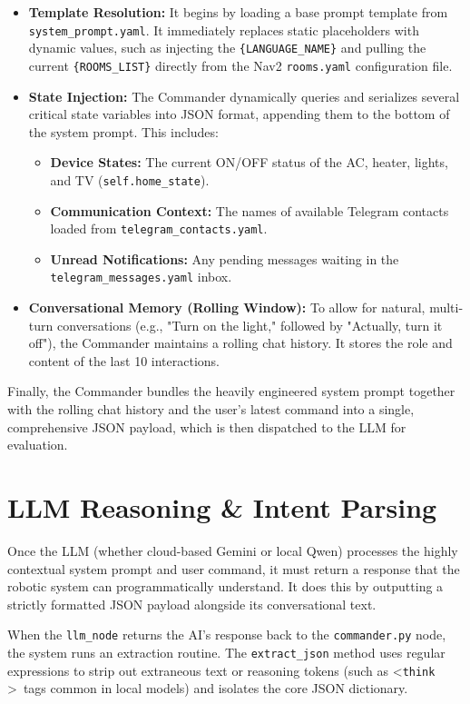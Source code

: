 \begin{itemize}
    \item \textbf{Template Resolution:} It begins by loading a base prompt template from \texttt{system\_prompt.yaml}. It immediately replaces static placeholders with dynamic values, such as injecting the \texttt{\{LANGUAGE\_NAME\}} and pulling the current \texttt{\{ROOMS\_LIST\}} directly from the Nav2 \texttt{rooms.yaml} configuration file.
    \item \textbf{State Injection:} The Commander dynamically queries and serializes several critical state variables into JSON format, appending them to the bottom of the system prompt. This includes:
    \begin{itemize}
        \item \textbf{Device States:} The current ON/OFF status of the AC, heater, lights, and TV (\texttt{self.home\_state}).
        \item \textbf{Communication Context:} The names of available Telegram contacts loaded from \texttt{telegram\_contacts.yaml}.
        \item \textbf{Unread Notifications:} Any pending messages waiting in the \texttt{telegram\_messages.yaml} inbox.
    \end{itemize}
    \item \textbf{Conversational Memory (Rolling Window):} To allow for natural, multi-turn conversations (e.g., "Turn on the light," followed by "Actually, turn it off"), the Commander maintains a rolling chat history. It stores the role and content of the last 10 interactions.
\end{itemize}

Finally, the Commander bundles the heavily engineered system prompt together with the rolling chat history and the user's latest command into a single, comprehensive JSON payload, which is then dispatched to the LLM for evaluation.

\section{LLM Reasoning \& Intent Parsing}
Once the LLM (whether cloud-based Gemini or local Qwen) processes the highly contextual system prompt and user command, it must return a response that the robotic system can programmatically understand. It does this by outputting a strictly formatted JSON payload alongside its conversational text.

When the \texttt{llm\_node} returns the AI's response back to the \texttt{commander.py} node, the system runs an extraction routine. The \texttt{extract\_json} method uses regular expressions to strip out extraneous text or reasoning tokens (such as \textless \texttt{think} \textgreater \ tags common in local models) and isolates the core JSON dictionary.

